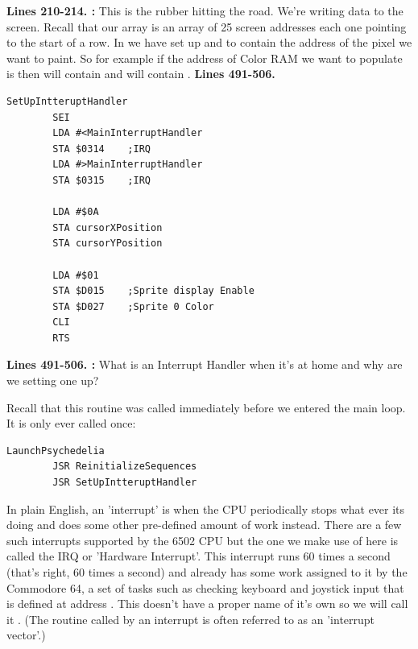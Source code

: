 \textbf{Lines 210-214. :} This is the rubber hitting the road. We're writing data to the
screen. Recall that our   array is an array of 25 screen addresses each one pointing
to the start of a row. In  we have set up  and  to contain the address of the pixel we want to paint. So for example if the address of Color RAM we want to populate
is  then  will contain  and  will
contain . 
\clearpage
\textbf{Lines 491-506. }
\begin{lstlisting}[caption= Setting up our Interrupt Handler]
SetUpIntteruptHandler   
        SEI 
        LDA #<MainInterruptHandler
        STA $0314    ;IRQ
        LDA #>MainInterruptHandler
        STA $0315    ;IRQ

        LDA #$0A
        STA cursorXPosition
        STA cursorYPosition

        LDA #$01
        STA $D015    ;Sprite display Enable
        STA $D027    ;Sprite 0 Color
        CLI 
        RTS 
\end{lstlisting}
\clearpage
{}
\textbf{Lines 491-506. :} What is an Interrupt Handler when it's at home and why are
we setting one up?

Recall that this routine was called immediately before we entered the main loop. It is only ever called once:
\begin{lstlisting}
LaunchPsychedelia   
        JSR ReinitializeSequences
        JSR SetUpIntteruptHandler
\end{lstlisting}

In plain English, an 'interrupt' is when the CPU periodically stops what ever its doing and does some other pre-defined amount
of work instead. There are a few such interrupts supported by the 6502 CPU but the one we make use of here is called the IRQ
or 'Hardware Interrupt'. This interrupt runs 60 times a second (that's right, 60 times a second) and already has some work
assigned to it by the Commodore 64, a set of tasks such as checking keyboard and joystick input that is defined at address .
This doesn't have a proper name of it's own so we will call it . (The routine called by an interrupt
is often referred to as an 'interrupt vector'.)

